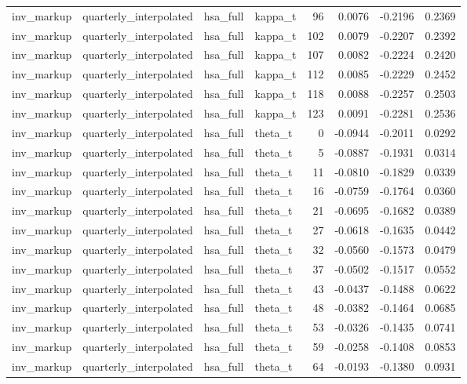 \begin{tabular}{llllrrrr}
inv\_markup & quarterly\_interpolated & hsa\_full & kappa\_t & 96 & 0.0076 & -0.2196 & 0.2369 \\
inv\_markup & quarterly\_interpolated & hsa\_full & kappa\_t & 102 & 0.0079 & -0.2207 & 0.2392 \\
inv\_markup & quarterly\_interpolated & hsa\_full & kappa\_t & 107 & 0.0082 & -0.2224 & 0.2420 \\
inv\_markup & quarterly\_interpolated & hsa\_full & kappa\_t & 112 & 0.0085 & -0.2229 & 0.2452 \\
inv\_markup & quarterly\_interpolated & hsa\_full & kappa\_t & 118 & 0.0088 & -0.2257 & 0.2503 \\
inv\_markup & quarterly\_interpolated & hsa\_full & kappa\_t & 123 & 0.0091 & -0.2281 & 0.2536 \\
inv\_markup & quarterly\_interpolated & hsa\_full & theta\_t & 0 & -0.0944 & -0.2011 & 0.0292 \\
inv\_markup & quarterly\_interpolated & hsa\_full & theta\_t & 5 & -0.0887 & -0.1931 & 0.0314 \\
inv\_markup & quarterly\_interpolated & hsa\_full & theta\_t & 11 & -0.0810 & -0.1829 & 0.0339 \\
inv\_markup & quarterly\_interpolated & hsa\_full & theta\_t & 16 & -0.0759 & -0.1764 & 0.0360 \\
inv\_markup & quarterly\_interpolated & hsa\_full & theta\_t & 21 & -0.0695 & -0.1682 & 0.0389 \\
inv\_markup & quarterly\_interpolated & hsa\_full & theta\_t & 27 & -0.0618 & -0.1635 & 0.0442 \\
inv\_markup & quarterly\_interpolated & hsa\_full & theta\_t & 32 & -0.0560 & -0.1573 & 0.0479 \\
inv\_markup & quarterly\_interpolated & hsa\_full & theta\_t & 37 & -0.0502 & -0.1517 & 0.0552 \\
inv\_markup & quarterly\_interpolated & hsa\_full & theta\_t & 43 & -0.0437 & -0.1488 & 0.0622 \\
inv\_markup & quarterly\_interpolated & hsa\_full & theta\_t & 48 & -0.0382 & -0.1464 & 0.0685 \\
inv\_markup & quarterly\_interpolated & hsa\_full & theta\_t & 53 & -0.0326 & -0.1435 & 0.0741 \\
inv\_markup & quarterly\_interpolated & hsa\_full & theta\_t & 59 & -0.0258 & -0.1408 & 0.0853 \\
inv\_markup & quarterly\_interpolated & hsa\_full & theta\_t & 64 & -0.0193 & -0.1380 & 0.0931 \\

\end{tabular}

